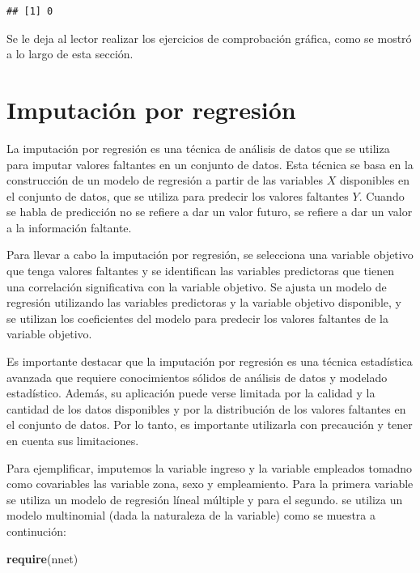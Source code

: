 \documentclass[
  spanish,
  12pt,
]{book}
\newenvironment{Shaded}{\begin{snugshade}}{\end{snugshade}}
\newcommand{\FunctionTok}[1]{\textcolor[rgb]{0.13,0.29,0.53}{\textbf{#1}}}
\newcommand{\NormalTok}[1]{#1}
\begin{document}
\begin{verbatim}
## [1] 0
\end{verbatim}

Se le deja al lector realizar los ejercicios de comprobación gráfica, como se mostró a lo largo de esta sección.

\section{Imputación por regresión}\label{imputaciuxf3n-por-regresiuxf3n}

La imputación por regresión es una técnica de análisis de datos que se utiliza para imputar valores faltantes en un conjunto de datos. Esta técnica se basa en la construcción de un modelo de regresión a partir de las variables \(X\) disponibles en el conjunto de datos, que se utiliza para predecir los valores faltantes \(Y\). Cuando se habla de predicción no se refiere a dar un valor futuro, se refiere a dar un valor a la información faltante.

Para llevar a cabo la imputación por regresión, se selecciona una variable objetivo que tenga valores faltantes y se identifican las variables predictoras que tienen una correlación significativa con la variable objetivo. Se ajusta un modelo de regresión utilizando las variables predictoras y la variable objetivo disponible, y se utilizan los coeficientes del modelo para predecir los valores faltantes de la variable objetivo.

Es importante destacar que la imputación por regresión es una técnica estadística avanzada que requiere conocimientos sólidos de análisis de datos y modelado estadístico. Además, su aplicación puede verse limitada por la calidad y la cantidad de los datos disponibles y por la distribución de los valores faltantes en el conjunto de datos. Por lo tanto, es importante utilizarla con precaución y tener en cuenta sus limitaciones.

Para ejemplificar, imputemos la variable ingreso y la variable empleados tomadno como covariables las variable zona, sexo y empleamiento. Para la primera variable se utiliza un modelo de regresión líneal múltiple y para el segundo. se utiliza un modelo multinomial (dada la naturaleza de la variable) como se muestra a continución:

\begin{Shaded}
\begin{Highlighting}[]
\FunctionTok{require}\NormalTok{(nnet)}
\end{Highlighting}
\end{Shaded}
\end{document}
